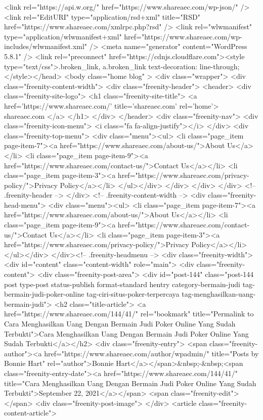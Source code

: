 <link rel="https://api.w.org/" href="https://www.shareaec.com/wp-json/" /><link rel="EditURI" type="application/rsd+xml" title="RSD" href="https://www.shareaec.com/xmlrpc.php?rsd" />
<link rel="wlwmanifest" type="application/wlwmanifest+xml" href="https://www.shareaec.com/wp-includes/wlwmanifest.xml" /> 
<meta name="generator" content="WordPress 5.8.1" />
<link rel="preconnect" href="https://cdnjs.cloudflare.com"><style type="text/css">.broken_link, a.broken_link {
	text-decoration: line-through;
}</style></head>
<body class="home blog" >
<div class="wrapper">
	<div class="freenity-content-width">
		<div class="freenity-header">
			<header>
				<div class="freenity-site-logo">
					<h1 class="freenity-site-title">
												<a href='https://www.shareaec.com/' title='shareaec.com' rel='home'>
							shareaec.com						</a>
					</h1>
				</div>
			</header>
			<div class="freenity-nav">
				<div class="freenity-icon-menu">
					<i class="fa fa-align-justify"></i>
				</div>
				<div class="freenity-top-menu">
					<div class="menu"><ul>
<li class="page_item page-item-7"><a href="https://www.shareaec.com/about-us/">About Us</a></li>
<li class="page_item page-item-9"><a href="https://www.shareaec.com/contact-us/">Contact Us</a></li>
<li class="page_item page-item-3"><a href="https://www.shareaec.com/privacy-policy/">Privacy Policy</a></li>
</ul></div>
				</div>
			</div>
		</div> <!-- .freenity-header -->
	</div> <!-- .freenity-content-width -->
	<div class="freenity-head-menu">
		<div class="menu"><ul>
<li class="page_item page-item-7"><a href="https://www.shareaec.com/about-us/">About Us</a></li>
<li class="page_item page-item-9"><a href="https://www.shareaec.com/contact-us/">Contact Us</a></li>
<li class="page_item page-item-3"><a href="https://www.shareaec.com/privacy-policy/">Privacy Policy</a></li>
</ul></div>
	</div><!-- .freenity-headmenu -->
	<div class="freenity-width">
		<div id="content" class="content-width" role="main">
			<div class="freenity-content">
				<div class="freenity-post-area">
												<div id="post-144" class="post-144 post type-post status-publish format-standard hentry category-bermain-judi tag-bermain-judi-poker-online tag-ciri-situs-poker-terpercaya tag-menghasilkan-uang-bermain-judi">
								<h2 class="title-article">
									<a href="https://www.shareaec.com/144/41/" rel="bookmark" title="Permalink to Cara Menghasilkan Uang Dengan Bermain Judi Poker Online Yang Sudah Terbukti">Cara Menghasilkan Uang Dengan Bermain Judi Poker Online Yang Sudah Terbukti</a></h2>
								<div class="freenity-entry">
									<span class="freenity-author"><a href="https://www.shareaec.com/author/wpadmin/" title="Posts by Bonnie Hart" rel="author">Bonnie Hart</a></span>&nbsp;-&nbsp;<span class="freenity-entry-date"><a href="https://www.shareaec.com/144/41/" title="Cara Menghasilkan Uang Dengan Bermain Judi Poker Online Yang Sudah Terbukti">September 22, 2021</a></span>
									<span class="freenity-edit"> </span>
									<div class="freenity-post-image">  </div>
																		<article class="freenity-content-article">
										

